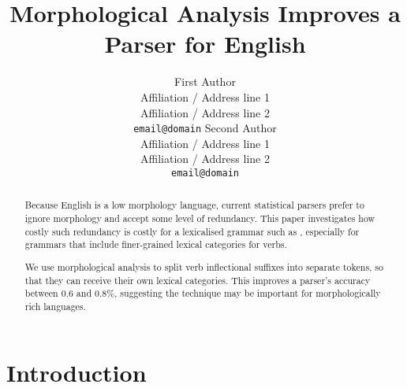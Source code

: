 \documentclass[11pt]{article}
\title{Morphological Analysis Improves a \ccg Parser for English}
\author{First Author\\
  Affiliation / Address line 1\\
  Affiliation / Address line 2\\
  {\tt email@domain}  \And
  Second Author\\
  Affiliation / Address line 1\\
  Affiliation / Address line 2\\
  {\tt  email@domain}}
\date{}
\begin{document}
\maketitle
\begin{abstract}
Because English is a low morphology
language, current statistical parsers prefer to ignore morphology and accept
some level of redundancy. This paper investigates how costly such redundancy is
costly for a lexicalised grammar such as \ccg, especially for grammars that
include finer-grained lexical categories for verbs.

We use morphological analysis to split verb inflectional suffixes into separate
tokens, so that they can receive their own lexical categories.
This improves a \ccg parser's accuracy between 0.6 and 0.8\%,
suggesting the technique may be important for morphologically
rich languages.
\end{abstract}

\section{Introduction}

\end{document}
